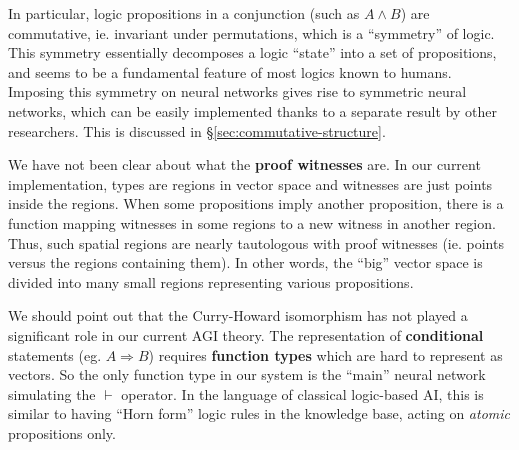 \documentclass[orivec]{llncs}
\begin{document}
In particular, logic propositions in a conjunction (such as $A \wedge B$) are commutative, ie. invariant under permutations, which is a ``symmetry'' of logic.  This symmetry essentially decomposes a logic ``state'' into a set of propositions, and seems to be a fundamental feature of most logics known to humans.  Imposing this symmetry on neural networks gives rise to symmetric neural networks, which can be easily implemented thanks to a separate result by other researchers.  This is discussed in \S\ref{sec:commutative-structure}.

We have not been clear about what the \textbf{proof witnesses} are.  In our current implementation, types are regions in vector space and witnesses are just points inside the regions.  When some propositions imply another proposition, there is a function mapping witnesses in some regions to a new witness in another region.  Thus, such spatial regions are nearly tautologous with proof witnesses (ie. points versus the regions containing them).  In other words, the ``big'' vector space is divided into many small regions representing various propositions.

We should point out that the Curry-Howard isomorphism has not played a significant role in our current AGI theory.  The representation of \textbf{conditional} statements (eg. $A \Rightarrow B$) requires \textbf{function types} which are hard to represent as vectors.  So the only function type in our system is the ``main'' neural network simulating the $\vdash$ operator.  In the language of classical logic-based AI, this is similar to having  ``Horn form'' logic rules in the knowledge base, acting on \textit{atomic} propositions only.
\end{document}
